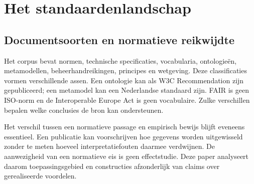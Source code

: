 \section{Het standaardenlandschap}
\subsection{Documentsoorten en normatieve reikwijdte}
Het corpus bevat normen, technische specificaties, vocabularia, ontologieën, metamodellen, beheerhandreikingen, principes en wetgeving. Deze classificaties vormen verschillende assen. Een ontologie kan als W3C Recommendation zijn gepubliceerd; een metamodel kan een Nederlandse standaard zijn. FAIR is geen ISO-norm en de Interoperable Europe Act is geen vocabulaire. Zulke verschillen bepalen welke conclusies de bron kan ondersteunen. \parencite{S30,S13,L11,S42}

Het verschil tussen een normatieve passage en empirisch bewijs blijft eveneens essentieel. Een publicatie kan voorschrijven hoe gegevens worden uitgewisseld zonder te meten hoeveel interpretatiefouten daarmee verdwijnen. De aanwezigheid van een normatieve eis is geen effectstudie. Deze paper analyseert daarom toepassingsgebied en constructies afzonderlijk van claims over gerealiseerde voordelen.

